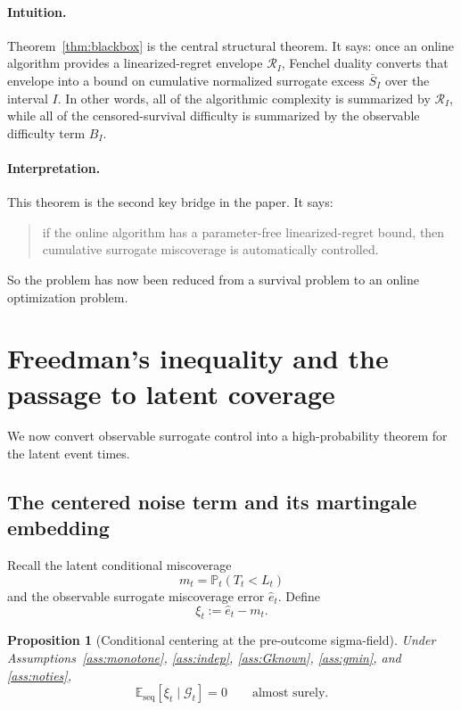 \documentclass[11pt]{article}
\newtheorem{proposition}{Proposition}
\newcommand{\E}{\mathbb{E}}
\newcommand{\Prob}{\mathbb{P}}
\newcommand{\1}{\mathbf{1}}
\newcommand{\seq}{\mathrm{seq}}
\newcommand{\cG}{\mathcal{G}}
\begin{document}
\paragraph{Intuition.} Theorem~\ref{thm:blackbox} is the central structural theorem. It says: once an online algorithm provides a linearized-regret envelope $\mathcal R_I$, Fenchel duality converts that envelope into a bound on cumulative normalized surrogate excess $\bar S_I$ over the interval $I$. In other words, all of the algorithmic complexity is summarized by $\mathcal R_I$, while all of the censored-survival difficulty is summarized by the observable difficulty term $B_I$.


\paragraph{Interpretation.}
This theorem is the second key bridge in the paper. It says:
\begin{quote}
if the online algorithm has a parameter-free linearized-regret bound, then cumulative surrogate miscoverage is automatically controlled.
\end{quote}

So the problem has now been reduced from a survival problem to an online optimization problem.

\section{Freedman's inequality and the passage to latent coverage}
\label{sec:freedman}

We now convert observable surrogate control into a high-probability theorem for the latent event times.

\subsection{The centered noise term and its martingale embedding}

Recall the latent conditional miscoverage
\[
m_t=\Prob_t(T_t< L_t)
\]
and the observable surrogate miscoverage error $\hat e_t$. Define
\[
\xi_t:=\hat e_t-m_t.
\]

\begin{proposition}[Conditional centering at the pre-outcome sigma-field]
\label{prop:mds-main}
Under Assumptions~\ref{ass:monotone}, \ref{ass:indep}, \ref{ass:Gknown}, \ref{ass:gmin}, and \ref{ass:noties},
\[
\E_{\seq}[\xi_t\mid \cG_t]=0
\qquad\text{almost surely.}
\]
\end{proposition}
\end{document}
